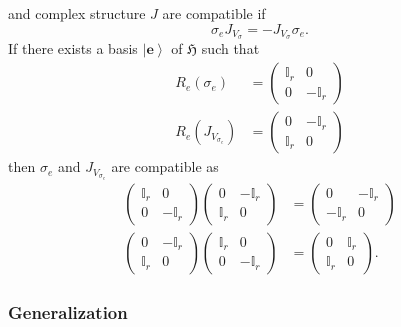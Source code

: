 \documentclass[aps,preprint]{revtex4}
\begin{document}
and complex structure $J$ are compatible if 
\begin{equation}
\mathcal{\sigma}_{e}J_{V_{\sigma}}=-J_{V_{\sigma}}\mathcal{\sigma}_{e}.
\end{equation}
If there exists a basis $\left\vert \mathbf{e}\right\rangle $ of $\mathfrak{H%
}$ such that 
\begin{align}
R_{e}\left( \mathcal{\sigma}_{e}\right) & =\left( 
\begin{array}{cc}
\mathbb{I}_{r} & 0 \\ 
0 & -\mathbb{I}_{r}%
\end{array}
\right) \\
R_{e}\left( J_{V_{\sigma_{e}}}\right) & =\left( 
\begin{array}{cc}
0 & -\mathbb{I}_{r} \\ 
\mathbb{I}_{r} & 0%
\end{array}
\right)
\end{align}
then $\sigma_{e}$ and $J_{V_{\sigma_{e}}}$ are compatible as%
\begin{align}
\left( 
\begin{array}{cc}
\mathbb{I}_{r} & 0 \\ 
0 & -\mathbb{I}_{r}%
\end{array}
\right) \left( 
\begin{array}{cc}
0 & -\mathbb{I}_{r} \\ 
\mathbb{I}_{r} & 0%
\end{array}
\right) & =\left( 
\begin{array}{cc}
0 & -\mathbb{I}_{r} \\ 
-\mathbb{I}_{r} & 0%
\end{array}
\right) \\
\left( 
\begin{array}{cc}
0 & -\mathbb{I}_{r} \\ 
\mathbb{I}_{r} & 0%
\end{array}
\right) \left( 
\begin{array}{cc}
\mathbb{I}_{r} & 0 \\ 
0 & -\mathbb{I}_{r}%
\end{array}
\right) & =\left( 
\begin{array}{cc}
0 & \mathbb{I}_{r} \\ 
\mathbb{I}_{r} & 0%
\end{array}
\right) .
\end{align}

\subsubsection{Generalization}
\end{document}

